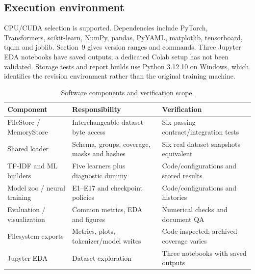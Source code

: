 \subsection{Execution environment}
CPU/CUDA selection is supported. Dependencies include PyTorch, Transformers, scikit-learn, NumPy, pandas, PyYAML, matplotlib, tensorboard, tqdm and joblib. Section~9 gives version ranges and commands. Three Jupyter EDA notebooks have saved outputs; a dedicated Colab setup has not been validated. Storage tests and report builds use Python 3.12.10 on Windows, which identifies the revision environment rather than the original training machine.
\begin{table}[htbp]\centering\small
\caption{Software components and verification scope.}\label{tab:implementation}
\begin{tabularx}{\linewidth}{lXX}\toprule
Component & Responsibility & Verification\\\midrule
FileStore / MemoryStore & Interchangeable dataset byte access & Six passing contract/integration tests\\
Shared loader & Schema, groups, coverage, masks and hashes & Six real dataset snapshots equivalent\\
TF-IDF and ML builders & Five learners plus diagnostic dummy & Code/configurations and stored results\\
Model zoo / neural training & E1--E17 and checkpoint policies & Code/configurations and histories\\
Evaluation / visualization & Common metrics, EDA and figures & Numerical checks and document QA\\
Filesystem exports & Metrics, plots, tokenizer/model writes & Code inspected; archived coverage varies\\
Jupyter EDA & Dataset exploration & Three notebooks with saved outputs\\\bottomrule
\end{tabularx}\end{table}
